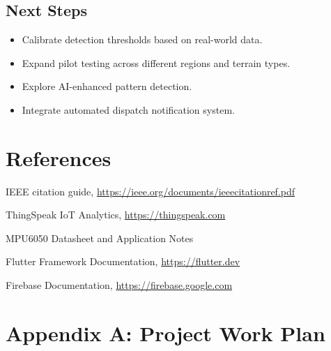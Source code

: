 \documentclass[12pt]{article}
\begin{document}
\subsection{Next Steps}
\begin{itemize}
  \item Calibrate detection thresholds based on real-world data.
  \item Expand pilot testing across different regions and terrain types.
  \item Explore AI-enhanced pattern detection.
  \item Integrate automated dispatch notification system.
\end{itemize}

\section*{References}
\begin{thebibliography}{9}

 IEEE citation guide, \url{https://ieee.org/documents/ieeecitationref.pdf}

 ThingSpeak IoT Analytics, \url{https://thingspeak.com}

 MPU6050 Datasheet and Application Notes

 Flutter Framework Documentation, \url{https://flutter.dev}

 Firebase Documentation, \url{https://firebase.google.com}

\end{thebibliography}

\section*{Appendix A: Project Work Plan}
\end{document}
